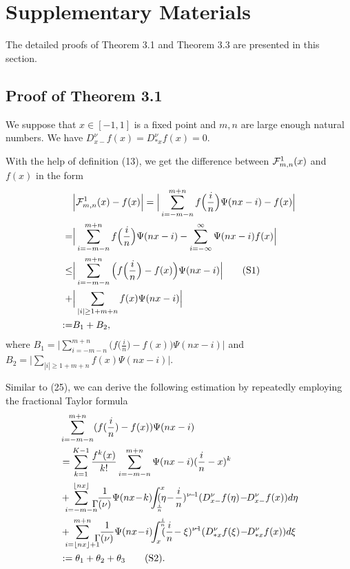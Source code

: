 \documentclass[journal]{IEEEtran}
\begin{document}
	

\clearpage
\setcounter{equation}{0}
\setcounter{page}{1}



{\color{black}\section* {Supplementary Materials}
The detailed proofs of Theorem 3.1 and Theorem 3.3 are presented in this section.
\subsection{Proof of Theorem 3.1}
We suppose that  $ x\in [-1,1]$ is a fixed point and  $m, n$ are large enough natural numbers.
We have $D_{x-}^{\nu}f(x)=D_{*x}^{\nu}f(x)=0.$

With the help of definition (13), we get  the difference between $\mathcal{F}_{m,n}^{{\color{black}1}}(x)$ and $f(x) $ in the form 
\begin{align}\label{B}
&\Big|\mathcal{F}_{m,n}^{{\color{black}1}}(x)-f(x)\Big|=\Big|\sum\limits_{i=-m-n}^{m+n}f
\Big(\frac{i}{n}\Big)\Psi(nx-i)-f(x)\Big|\notag\\
=&\Big|\sum\limits_{i=-m-n}^{m+n}f\Big(\frac{i}{n}\Big)\Psi(nx-i)-
\sum\limits_{i=-\infty}^{\infty}\Psi(nx-i)f(x)\Big|\notag\\
\leq&\Big|\sum\limits_{i=-m-n}^{m+n}\Big(f\Big(\frac{i}{n}\Big)-f(x)\Big)\Psi(nx-i)\Big|\tag{S1}\\
+&\Big|\sum\limits_{|i|\geq 1+m+n}f(x)\Psi(nx-i)\Big|\notag\\
:=&B_{1}+B_{2},\notag
\end{align}
where $B_{1}=\Big|\sum\limits_{i=-m-n}^{m+n}\Big(f\Big(\frac{i}{n}\Big)-f(x)\Big)\Psi(nx-i)\Big|$
and
$B_{2}=\Big|\sum\limits_{|i|\geq 1+m+n}f(x)\Psi(nx-i)\Big|$.

Similar to (25), we can derive the following estimation by repeatedly employing the fractional Taylor formula
\begin{align}
    &\sum\limits_{i=-m-n}^{m+n}(f(\frac{i}{n})-f(x))\Psi(nx-i)
   \notag\\
    &=\sum\limits_{k=1}^{K-1}\frac{f^{k}(x)}{k!}\sum\limits_{i=-m-n}^{m+n}\Psi(nx-i)(\frac{i}{n}-x)^{k}\notag\\
    &+\!\!\!\!\sum\limits_{i=-m-n}^{\lfloor nx\rfloor}\!\frac{1}{\!\!\!\!\Gamma(\nu)}\Psi(nx\!-\!k)\!\!\int^{x}_{\frac{i}{n}}\!\!\!\!\!(\eta\!-\!\frac{i}{n})^{\nu\!-\!1}
    (D_{x-}^{\nu}f(\eta)\!-\!\!D_{x-}^{\nu}f(x))d\eta\notag\\
    &+\!\!\!\!\sum\limits_{i=\lfloor nx\rfloor +1}^{m+n}\!\frac{1}{\!\!\!\!\Gamma(\nu)}\Psi(nx\!-\!i)
   \!\!\int_{x}^{\!\frac{i}{n}}\!\!\!(\frac{i}{n}\!-\xi)^{\nu\!\!-\!\!1}
   (D_{*x}^{\nu}f(\xi)\!-\!\!D_{*x}^{\nu}f(x))d\xi\notag\\
   &:=\theta_{1}+\theta_{2}+\theta_{3}\tag{S2}. 
\end{align} 

}
\end{document}

